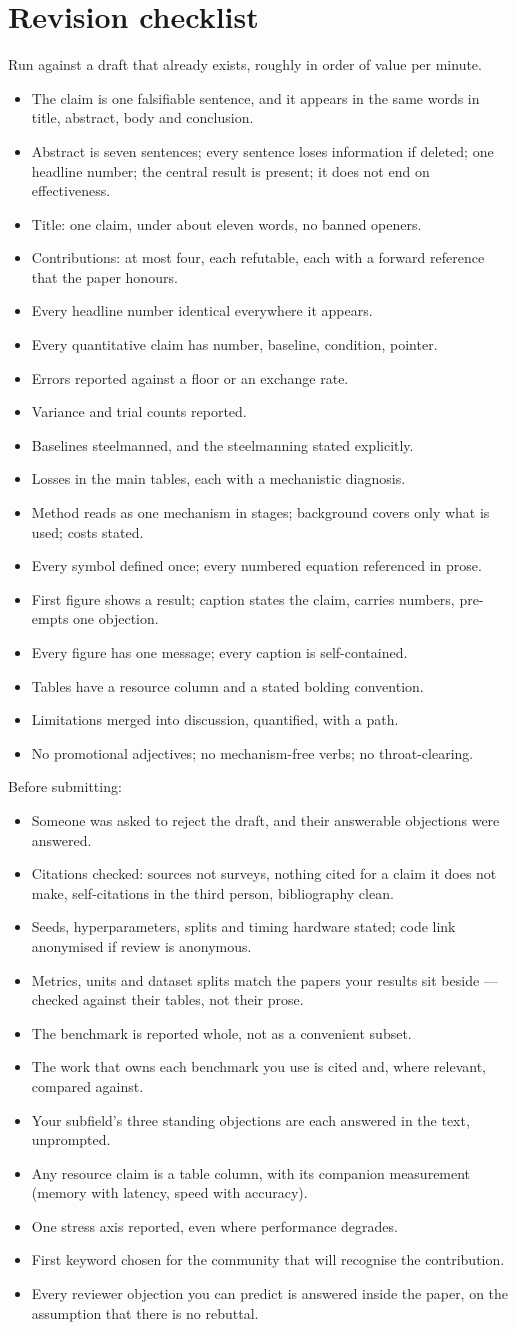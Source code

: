 \documentclass[11pt,a4paper]{article}
\newcommand{\ck}{\item[$\square$]}
\begin{document}
\section{Revision checklist}

Run against a draft that already exists, roughly in order of value per minute.

\begin{itemize}[leftmargin=*]
  \ck The claim is one falsifiable sentence, and it appears in the same words
    in title, abstract, body and conclusion.
  \ck Abstract is seven sentences; every sentence loses information if
    deleted; one headline number; the central result is present; it does not
    end on effectiveness.
  \ck Title: one claim, under about eleven words, no banned openers.
  \ck Contributions: at most four, each refutable, each with a forward
    reference that the paper honours.
  \ck Every headline number identical everywhere it appears.
  \ck Every quantitative claim has number, baseline, condition, pointer.
  \ck Errors reported against a floor or an exchange rate.
  \ck Variance and trial counts reported.
  \ck Baselines steelmanned, and the steelmanning stated explicitly.
  \ck Losses in the main tables, each with a mechanistic diagnosis.
  \ck Method reads as one mechanism in stages; background covers only what is
    used; costs stated.
  \ck Every symbol defined once; every numbered equation referenced in prose.
  \ck First figure shows a result; caption states the claim, carries numbers,
    pre-empts one objection.
  \ck Every figure has one message; every caption is self-contained.
  \ck Tables have a resource column and a stated bolding convention.
  \ck Limitations merged into discussion, quantified, with a path.
  \ck No promotional adjectives; no mechanism-free verbs; no throat-clearing.
\end{itemize}

\noindent Before submitting:

\begin{itemize}[leftmargin=*]
  \ck Someone was asked to reject the draft, and their answerable objections
    were answered.
  \ck Citations checked: sources not surveys, nothing cited for a claim it
    does not make, self-citations in the third person, bibliography clean.
  \ck Seeds, hyperparameters, splits and timing hardware stated; code link
    anonymised if review is anonymous.
  \ck Metrics, units and dataset splits match the papers your results sit
    beside --- checked against their tables, not their prose.
  \ck The benchmark is reported whole, not as a convenient subset.
  \ck The work that owns each benchmark you use is cited and, where
    relevant, compared against.
  \ck Your subfield's three standing objections are each answered in the
    text, unprompted.
  \ck Any resource claim is a table column, with its companion measurement
    (memory with latency, speed with accuracy).
  \ck One stress axis reported, even where performance degrades.
  \ck First keyword chosen for the community that will recognise the
    contribution.
  \ck Every reviewer objection you can predict is answered inside the paper,
    on the assumption that there is no rebuttal.
\end{itemize}
\end{document}
